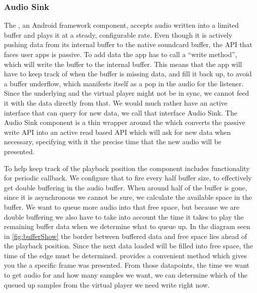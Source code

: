 \subsubsection{Audio Sink}\label{subsubsec:audiotrack}

The , an Android framework component, accepts audio
written into a limited buffer and plays it at a steady, configurable
rate. Even though it is actively pushing data from its internal buffer
to the native soundcard buffer, the API that faces user apps is passive.
To add data the app has to call a \enquote{write method}, which will write the
buffer to the internal  buffer. This means that the app
will have to keep track of when the  buffer is missing data,
and fill it back up, to avoid a buffer underflow, which manifests itself
as a pop in the audio for the listener. Since the underlying
 and the virtual player might not be in sync, we cannot
feed it with the data directly from that. We would much rather have an
active interface that can query for new data, we call that interface
Audio Sink. The Audio Sink component is a thin wrapper around the
 which converts the passive write API into an active
read based API which will ask for new data when necessary, specifying
with it the precise time that the new audio will be presented.

To help keep track of the playback position the 
component includes functionality for periodic callback. We configure
that to fire every half buffer size, to effectively get double buffering
in the audio buffer. When around half of the buffer is gone, since it is
asynchronous we cannot be sure, we calculate the available space in the
buffer. We want to queue more audio into that free space, but because we
are double buffering we also have to take into account the time it takes
to play the remaining buffer data when we determine what to queue up. In
the diagram seen in \cref{fig:bufferShow} the border between buffered
data and free space lies ahead of the playback position. Since the next
data loaded will be filled into free space, the time of the edge must be
determined.  provides a convenient 
method which gives you the  a specific frame was
presented. From those datapoints, the time we want to get audio for and
how many samples we want, we can determine which of the queued up
samples from the virtual player we need write right now.

